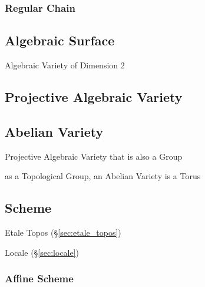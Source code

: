 \subsubsection{Regular Chain}\label{sec:regular_chain}



\subsection{Algebraic Surface}\label{sec:algebraic_surface}

Algebraic Variety of Dimension 2



\subsection{Projective Algebraic Variety}
\label{sec:projective_algebraic_variety}

\subsection{Abelian Variety}\label{sec:abelian_variety}

Projective Algebraic Variety that is also a Group

as a Topological Group, an Abelian Variety is a Torus %


\subsection{Scheme}\label{sec:scheme}

Etale Topos (\S\ref{sec:etale_topos})

Locale (\S\ref{sec:locale})



\subsubsection{Affine Scheme}\label{sec:affine_scheme}



